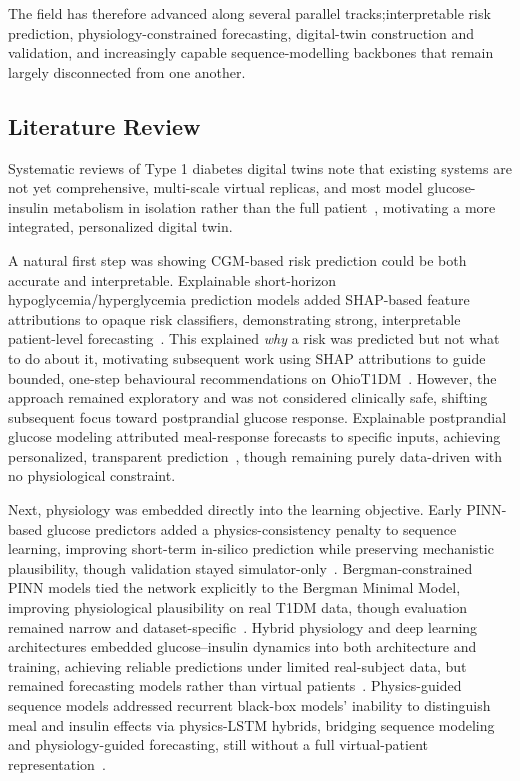 \documentclass[journal]{IEEEtran}
\begin{document}
The field has therefore advanced along several parallel tracks;interpretable risk prediction, physiology-constrained forecasting, digital-twin construction and validation, and increasingly capable sequence-modelling backbones that remain largely disconnected from one another.

\subsection{Literature Review}

Systematic reviews of Type 1 diabetes digital twins note that existing systems are not yet comprehensive, multi-scale virtual replicas, and most model glucose-insulin metabolism in isolation rather than the full patient~\cite{ref2}, motivating a more integrated, personalized digital twin.

A natural first step was showing CGM-based risk prediction could be both accurate and interpretable. Explainable short-horizon hypoglycemia/hyperglycemia prediction models added SHAP-based feature attributions to opaque risk classifiers, demonstrating strong, interpretable patient-level forecasting~\cite{ref3}. This explained \emph{why} a risk was predicted but not what to do about it, motivating subsequent work using SHAP attributions to guide bounded, one-step behavioural recommendations on OhioT1DM~\cite{ref6}. However, the approach remained exploratory and was not considered clinically safe, shifting subsequent focus toward postprandial glucose response. Explainable postprandial glucose modeling attributed meal-response forecasts to specific inputs, achieving personalized, transparent prediction~\cite{ref7}, though remaining purely data-driven with no physiological constraint.

Next, physiology was embedded directly into the learning objective. Early PINN-based glucose predictors added a physics-consistency penalty to sequence learning, improving short-term in-silico prediction while preserving mechanistic plausibility, though validation stayed simulator-only~\cite{ref9}. Bergman-constrained PINN models tied the network explicitly to the Bergman Minimal Model, improving physiological plausibility on real T1DM data, though evaluation remained narrow and dataset-specific~\cite{ref10}. Hybrid physiology and deep learning architectures embedded glucose--insulin dynamics into both architecture and training, achieving reliable predictions under limited real-subject data, but remained forecasting models rather than virtual patients~\cite{ref11}. Physics-guided sequence models addressed recurrent black-box models' inability to distinguish meal and insulin effects via physics-LSTM hybrids, bridging sequence modeling and physiology-guided forecasting, still without a full virtual-patient representation~\cite{ref12}.
\end{document}
